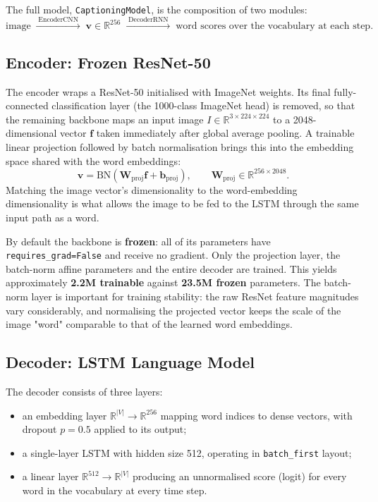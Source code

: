 \documentclass{article}
\begin{document}
The full model, \texttt{CaptioningModel}, is the composition of two modules:
\begin{equation*}
  \text{image} \;\xrightarrow{\;\text{EncoderCNN}\;}\;
  \mathbf{v} \in \mathbb{R}^{256} \;\xrightarrow{\;\text{DecoderRNN}\;}\;
  \text{word scores over the vocabulary at each step.}
\end{equation*}

\subsection{Encoder: Frozen ResNet-50}

The encoder wraps a ResNet-50 initialised with ImageNet weights. Its final
fully-connected classification layer (the 1000-class ImageNet head) is removed,
so that the remaining backbone maps an input image
$I \in \mathbb{R}^{3 \times 224 \times 224}$ to a 2048-dimensional vector
$\mathbf{f}$ taken immediately after global average pooling. A trainable linear
projection followed by batch normalisation brings this into the embedding space
shared with the word embeddings:
\begin{equation}
  \mathbf{v} = \mathrm{BN}\!\left( \mathbf{W}_{\text{proj}} \mathbf{f} +
  \mathbf{b}_{\text{proj}} \right),
  \qquad
  \mathbf{W}_{\text{proj}} \in \mathbb{R}^{256 \times 2048}.
\end{equation}
Matching the image vector's dimensionality to the word-embedding dimensionality
is what allows the image to be fed to the LSTM through the same input path as a
word.

By default the backbone is \textbf{frozen}: all of its parameters have
\texttt{requires\_grad=False} and receive no gradient. Only the projection layer,
the batch-norm affine parameters and the entire decoder are trained. This yields
approximately \textbf{2.2M trainable} against \textbf{23.5M frozen} parameters.
The batch-norm layer is important for training stability: the raw ResNet feature
magnitudes vary considerably, and normalising the projected vector keeps the
scale of the image "word" comparable to that of the learned word embeddings.

\subsection{Decoder: LSTM Language Model}

The decoder consists of three layers:
\begin{itemize}
  \item an embedding layer $\mathbb{R}^{|V|} \to \mathbb{R}^{256}$ mapping word
        indices to dense vectors, with dropout $p = 0.5$ applied to its output;
  \item a single-layer LSTM with hidden size 512, operating in
        \texttt{batch\_first} layout;
  \item a linear layer $\mathbb{R}^{512} \to \mathbb{R}^{|V|}$ producing an
        unnormalised score (logit) for every word in the vocabulary at every
        time step.
\end{itemize}
\end{document}
